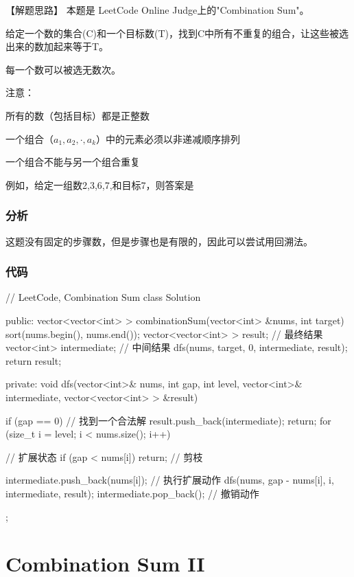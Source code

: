 【解题思路】
本题是 LeetCode Online Judge上的"Combination Sum"。

给定一个数的集合(C)和一个目标数(T)，找到C中所有不重复的组合，让这些被选出来的数加起来等于T。

每一个数可以被选无数次。

注意：
\begindot
\item 所有的数（包括目标）都是正整数
\item 一个组合（$a_1,a_2,\cdot,a_k$）中的元素必须以非递减顺序排列
\item 一个组合不能与另一个组合重复
\myenddot

例如，给定一组数2,3,6,7,和目标7，则答案是
\begin{Code}
[7]
[2, 2, 3] 
\end{Code}

\subsubsection{分析}
这题没有固定的步骤数，但是步骤也是有限的，因此可以尝试用回溯法。

\subsubsection{代码}

\begin{Codex}[label=combination_sum.cpp]
// LeetCode, Combination Sum
class Solution {
public:
    vector<vector<int> > combinationSum(vector<int> &nums, int target) {
        sort(nums.begin(), nums.end());
        vector<vector<int> > result; // 最终结果
        vector<int> intermediate; // 中间结果
        dfs(nums, target, 0, intermediate, result);
        return result;
    }

private:
    void dfs(vector<int>& nums, int gap, int level, vector<int>& intermediate,
            vector<vector<int> > &result) {
        if (gap == 0) {  // 找到一个合法解
            result.push_back(intermediate);
            return;
        }
        for (size_t i = level; i < nums.size(); i++) { // 扩展状态
            if (gap < nums[i]) return; // 剪枝

            intermediate.push_back(nums[i]); // 执行扩展动作
            dfs(nums, gap - nums[i], i, intermediate, result);
            intermediate.pop_back();  // 撤销动作
        }
    }
};
\end{Codex}


\section{Combination Sum II} %

